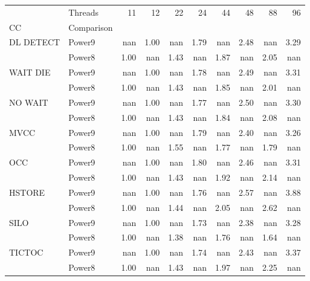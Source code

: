\begin{tabular}{llrrrrrrrr}
\toprule
       & Threads &   11 &   12 &   22 &   24 &   44 &   48 &   88 &   96 \\
CC & Comparison &      &      &      &      &      &      &      &      \\
\midrule
DL DETECT & Power9 &  nan & 1.00 &  nan & 1.79 &  nan & 2.48 &  nan & 3.29 \\
       & Power8 & 1.00 &  nan & 1.43 &  nan & 1.87 &  nan & 2.05 &  nan \\
WAIT DIE & Power9 &  nan & 1.00 &  nan & 1.78 &  nan & 2.49 &  nan & 3.31 \\
       & Power8 & 1.00 &  nan & 1.43 &  nan & 1.85 &  nan & 2.01 &  nan \\
NO WAIT & Power9 &  nan & 1.00 &  nan & 1.77 &  nan & 2.50 &  nan & 3.30 \\
       & Power8 & 1.00 &  nan & 1.43 &  nan & 1.84 &  nan & 2.08 &  nan \\
MVCC & Power9 &  nan & 1.00 &  nan & 1.79 &  nan & 2.40 &  nan & 3.26 \\
       & Power8 & 1.00 &  nan & 1.55 &  nan & 1.77 &  nan & 1.79 &  nan \\
OCC & Power9 &  nan & 1.00 &  nan & 1.80 &  nan & 2.46 &  nan & 3.31 \\
       & Power8 & 1.00 &  nan & 1.43 &  nan & 1.92 &  nan & 2.14 &  nan \\
HSTORE & Power9 &  nan & 1.00 &  nan & 1.76 &  nan & 2.57 &  nan & 3.88 \\
       & Power8 & 1.00 &  nan & 1.44 &  nan & 2.05 &  nan & 2.62 &  nan \\
SILO & Power9 &  nan & 1.00 &  nan & 1.73 &  nan & 2.38 &  nan & 3.28 \\
       & Power8 & 1.00 &  nan & 1.38 &  nan & 1.76 &  nan & 1.64 &  nan \\
TICTOC & Power9 &  nan & 1.00 &  nan & 1.74 &  nan & 2.43 &  nan & 3.37 \\
       & Power8 & 1.00 &  nan & 1.43 &  nan & 1.97 &  nan & 2.25 &  nan \\
\bottomrule
\end{tabular}
